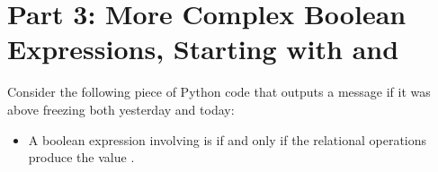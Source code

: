 \documentclass[letterpaper,10pt,english]{sphinxmanual}
\begin{document}
\section{Part 3: More Complex Boolean Expressions, Starting with and}
\label{\detokenize{lecture_notes/lec06_conditionals1:part-3-more-complex-boolean-expressions-starting-with-and}}
Consider the following piece of Python code that outputs a message if
it was above freezing both yesterday and today:
\begin{quote}

\begin{sphinxVerbatim}[commandchars=\\\{\}]
  
  
       
\end{sphinxVerbatim}
\end{quote}
\begin{itemize}
\item {} 
A boolean expression involving  is  if and only if
 the relational operations produce the value .

\end{itemize}
\end{document}
